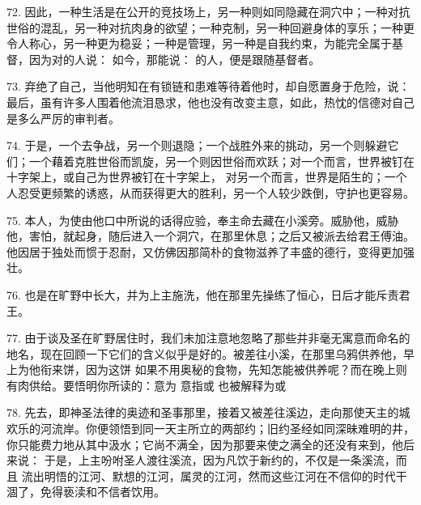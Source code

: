 72. 因此，一种生活是在公开的竞技场上，另一种则如同隐藏在洞穴中；一种对抗世俗的混乱，另一种对抗肉身的欲望；一种克制，另一种回避身体的享乐；一种更令人称心，另一种更为稳妥；一种是管理，另一种是自我约束，为能完全属于基督，因为对的人说： 如今，那能说： 的人，便是跟随基督者。\par

73. 弃绝了自己，当他明知在有锁链和患难等待着他时，却自愿置身于危险，说： 最后，虽有许多人围着他流泪恳求，他也没有改变主意，如此，热忱的信德对自己是多么严厉的审判者。\par

74. 于是，一个去争战，另一个则退隐；一个战胜外来的挑动，另一个则躲避它们；一个藉着克胜世俗而凯旋，另一个则因世俗而欢跃；对一个而言，世界被钉在十字架上，或自己为世界被钉在十字架上， 对另一个而言，世界是陌生的；一个人忍受更频繁的诱惑，从而获得更大的胜利，另一个人较少跌倒，守护也更容易。\par

75. 本人，为使由他口中所说的话得应验，奉主命去藏在小溪旁。威胁他，威胁他，害怕，就起身，随后进入一个洞穴，在那里休息；之后又被派去给君王傅油。他因居于独处而惯于忍耐，又仿佛因那简朴的食物滋养了丰盛的德行，变得更加强壮。\par

76. 也是在旷野中长大，并为上主施洗，他在那里先操练了恒心，日后才能斥责君王。\par

77. 由于谈及圣在旷野居住时，我们未加注意地忽略了那些并非毫无寓意而命名的地名，现在回顾一下它们的含义似乎是好的。被差往小溪，在那里乌鸦供养他，早上为他衔来饼，因为这饼 如果不用奥秘的食物，先知怎能被供养呢？而在晚上则有肉供给。要悟明你所读的：意为 意指或 也被解释为或\par

78. 先去，即神圣法律的奥迹和圣事那里，接着又被差往溪边，走向那使天主的城欢乐的河流岸。你便领悟到同一天主所立的两部约；旧约圣经如同深昧难明的井，你只能费力地从其中汲水；它尚不满全，因为那要来使之满全的还没有来到，他后来说： 于是，上主吩咐圣人渡往溪流，因为凡饮于新约的，不仅是一条溪流，而且 流出明悟的江河、默想的江河，属灵的江河，然而这些江河在不信仰的时代干涸了，免得亵渎和不信者饮用。\par

